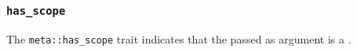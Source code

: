 
\subsubsection{\texttt{has\_scope}}

The \texttt{meta::has\_scope}
trait indicates that the  passed as argument is a .


